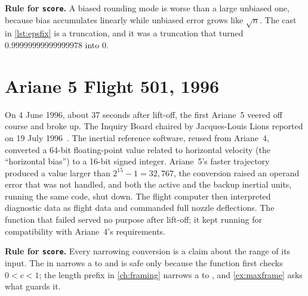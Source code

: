 \textbf{Rule for \texttt{score}.} A biased rounding mode is worse than a large unbiased one, because bias accumulates
linearly while unbiased error grows like $\sqrt{n}$. The cast  in \cref{lst:epsfix} is a
truncation, and it was a truncation that turned $0.99999999999999978$ into $0$.

\section{Ariane 5 Flight 501, 1996}\label{sec:hist-ariane}
On 4 June 1996, about 37 seconds after lift-off, the first Ariane~5 veered off course and broke up. The Inquiry Board
chaired by Jacques-Louis Lions reported on 19 July 1996~\cite{lions1996ariane}. The inertial reference software, reused from
Ariane~4, converted a 64-bit floating-point value related to horizontal velocity (the ``horizontal bias'') to a 16-bit
signed integer. Ariane~5's faster trajectory produced a value larger than $2^{15}-1=32{,}767$, the conversion raised an
operand error that was not handled, and both the active and the backup inertial units, running the same code, shut down.
The flight computer then interpreted diagnostic data as flight data and commanded full nozzle deflections. The function
that failed served no purpose after lift-off; it kept running for compatibility with Ariane~4's requirements.

\textbf{Rule for \texttt{score}.} Every narrowing conversion is a claim about the range of its input. The 
in  narrows a  to  and is safe only because the function first checks
$0<c<1$; the length prefix in \cref{ch:framing} narrows a  to , and \cref{ex:maxframe} asks what
guards it.

